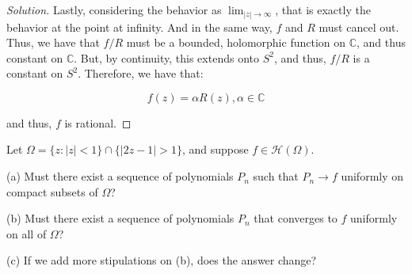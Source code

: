 \documentclass[10pt]{article}
\newenvironment{problem}[2][]{\begin{trivlist}
\item[\hskip \labelsep {\bfseries #1}\hskip \labelsep {\bfseries #2.}]}{\end{trivlist}}
\begin{document}
\begin{proof}[Solution]
Lastly, considering the behavior as $\lim_{|z| \to \infty}$, that is exactly the behavior at the point at infinity. And in the same way, $f$ and $R$ must cancel out. Thus, we have that $f/R$ must be a bounded, holomorphic function on $\mathbb{C}$, and thus constant on $\mathbb{C}$. But, by continuity, this extends onto $S^2$, and thus, $f/R$ is a constant on $S^2$. Therefore, we have that:

$$f(z) = \alpha R(z), \alpha \in \mathbb{C}$$

and thus, $f$ is rational.

\end{proof}

\begin{problem}{Question 2}

Let $\Omega = \{ z : |z| < 1 \} \cap \{ |2z - 1| > 1 \}$, and suppose $f \in \mathcal{H}(\Omega)$.

(a) Must there exist a sequence of polynomials $P_n$ such that $P_n \to f$ uniformly on compact subsets of $\Omega$?

(b) Must there exist a sequence of polynomials $P_n$ that converges to $f$ uniformly on all of $\Omega$?

(c) If we add more stipulations on (b), does the answer change? 

\end{problem}
\end{document}
